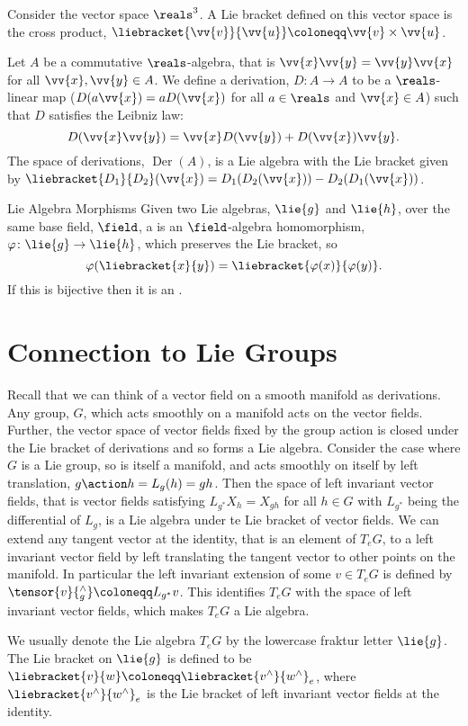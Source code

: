 Consider the vector space \(\reals^3\).
A Lie bracket defined on this vector space is the cross product, \(\liebracket{\vv{v}}{\vv{u}} \coloneqq \vv{v} \times \vv{u}\).

Let \(A\) be a commutative \(\reals\)-algebra, that is \(\vv{x}\vv{y} = \vv{y}\vv{x}\) for all \(\vv{x}, \vv{y} \in A\).
We define a derivation, \(D \colon A \to A\) to be a \(\reals\)-linear map (\(D(a\vv{x}) = aD(\vv{x})\) for all \(a \in \reals\) and \(\vv{x} \in A\)) such that \(D\) satisfies the Leibniz law:
\begin{equation}
    D(\vv{x}\vv{y}) = \vv{x}D(\vv{y}) + D(\vv{x})\vv{y}.
\end{equation}
The space of derivations, \(\mathop{\mathrm{Der}}(A)\), is a Lie algebra with the Lie bracket given by \(\liebracket{D_1}{D_2}(\vv{x}) = D_1(D_2(\vv{x})) - D_2(D_1(\vv{x}))\).

\begin{dfn}{Lie Algebra Morphisms}{}
    Given two Lie algebras, \(\lie{g}\) and \(\lie{h}\), over the same base field, \(\field\), a  is an \(\field\)-algebra homomorphism, \(\varphi\colon \lie{g} \to \lie{h}\), which preserves the Lie bracket, so
    \begin{equation}
        \varphi(\liebracket{x}{y}) = \liebracket{\varphi(x)}{\varphi(y)}.
    \end{equation}
    If this is bijective then it is an .
\end{dfn}

\section{Connection to Lie Groups}
Recall that we can think of a vector field on a smooth manifold as derivations.
Any group, \(G\), which acts smoothly on a manifold acts on the vector fields.
Further, the vector space of vector fields fixed by the group action is closed under the Lie bracket of derivations and so forms a Lie algebra.
Consider the case where \(G\) is a Lie group, so is itself a manifold, and acts smoothly on itself by left translation, \(g\action h = L_g(h) = gh\).
Then the space of left invariant vector fields, that is vector fields satisfying \(L_{g^*}X_h = X_{gh}\) for all \(h \in G\) with \(L_{g^*}\) being the differential of \(L_g\), is a Lie algebra under te Lie bracket of vector fields.
We can extend any tangent vector at the identity, that is an element of \(T_eG\), to a left invariant vector field by left translating the tangent vector to other points on the manifold.
In particular the left invariant extension of some \(v \in T_eG\) is defined by \(\tensor{v}{^\wedge_g} \coloneqq L_{g^*}v\).
This identifies \(T_eG\) with the space of left invariant vector fields, which makes \(T_eG\) a Lie algebra.

We usually denote the Lie algebra \(T_eG\) by the lowercase fraktur letter \(\lie{g}\).
The Lie bracket on \(\lie{g}\) is defined to be \(\liebracket{v}{w} \coloneqq \liebracket{v^{\wedge}}{w^{\wedge}}_e\), where \(\liebracket{v^{\wedge}}{w^{\wedge}}_e\) is the Lie bracket of left invariant vector fields at the identity.